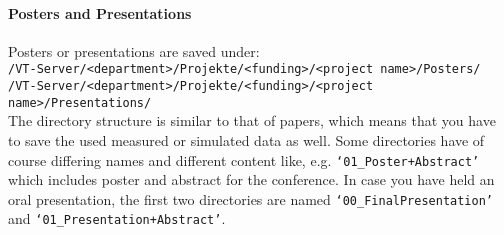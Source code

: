 \paragraph{Posters and Presentations}

\noindent Posters or presentations are saved under: \\
\texttt{/VT-Server/<department>/Projekte/<funding>/<project name>/Posters/} \\
\texttt{/VT-Server/<department>/Projekte/<funding>/<project name>/Presentations/} \\
The directory structure is similar to that of papers, which means that you have
to save the used measured or simulated data as well. Some directories have of
course differing names and different content like, e.g.
\texttt{‘01\_Poster+Abstract’} which includes poster and abstract for the
conference. In case you have held an oral presentation, the first two
directories are named \texttt{‘00\_FinalPresentation’} and
\texttt{‘01\_Presentation+Abstract’}.
\begin{table}[!h]
  \caption{%
  The data of every poster has to be saved in seven subdirectories;
  further remarks: \\
  **When the poster was presented, the corresponding presenter loads the last
  and revised version (i.e. only the real used but absolutely complete data)
  into the protected directory \\
  ***If the data reproduced in a figure/table is from distributed raw data
  directories, it is sufficient to save here only the generating program%
  }

\label{table:poster-directory-structure}
\end{table}
